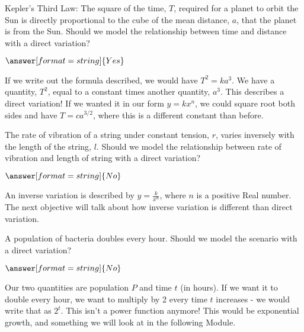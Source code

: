 \documentclass{ximera}
\begin{document}
\begin{question}
[Astronomy] Kepler's Third Law: The square of the time, $T$, required for a planet to orbit the Sun is directly proportional to the cube of the mean distance, $a$, that the planet is from the Sun. Should we model the relationship between time and distance with a direct variation?

$\answer[format=string]{Yes}$

\begin{feedback}
If we write out the formula described, we would have $T^2 = k a^3$. We have a quantity, $T^2$, equal to a constant times another quantity, $a^3$. This describes a direct variation! If we wanted it in our form $y = k x^n$, we could square root both sides and have $T = c a^{3/2}$, where this is a different constant than before. 
\end{feedback}
\end{question}

\begin{question}
[Physics] The rate of vibration of a string under constant tension, $r$, varies inversely with the length of the string, $l$. Should we model the relationship between rate of vibration and length of string with a direct variation?

$\answer[format=string]{No}$

\begin{feedback}
An inverse variation is described by $y = \frac{k}{x^n}$, where $n$ is a positive Real number. The next objective will talk about how inverse variation is different than direct variation. 
\end{feedback}

\end{question}


\begin{question}
A population of bacteria doubles every hour. Should we model the scenario with a direct variation?

$\answer[format=string]{No}$

\begin{feedback}
Our two quantities are population $P$ and time $t$ (in hours). If we want it to double every hour, we want to multiply by 2 every time $t$ increases - we would write that as $2^t$. This isn't a power function anymore! This would be exponential growth, and something we will look at in the following Module. 
\end{feedback}

\end{question}
\end{document}
